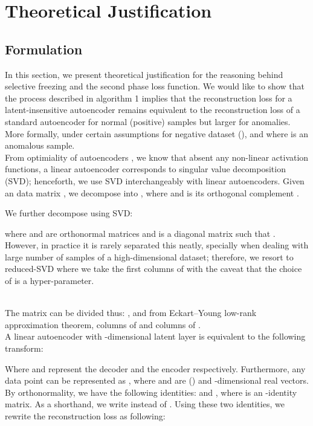\documentclass[acmtog, nonacm]{acmart}
\begin{document}
\section{Theoretical
Justification}
\subsection{Formulation}
\newcommand*{\vertbar}{\rule[-1ex]{0.5pt}{2.5ex}}
\newcommand*{\horzbar}{\rule[.5ex]{2.5ex}{0.5pt}}
\newcommand{\centered}[1]{\begin{tabular}{l} #1 \end{tabular}}
In this section, we present theoretical justification for the reasoning behind selective freezing and the second phase loss function. We would like to show that the process described in algorithm 1 implies that the reconstruction loss for a latent-insensitive autoencoder  remains equivalent to the reconstruction loss of a standard autoencoder  for normal (positive) samples but larger for anomalies. More formally, under certain assumptions for negative dataset (),  and   where  is an anomalous sample.\\
\noindent
From optimiality of autoencoders \cite{bourlard1988auto}, we know that absent any non-linear activation functions, a linear autoencoder corresponds to singular value decomposition (SVD); henceforth, we use SVD interchangeably with linear autoencoders. Given an  data matrix , 
we decompose  into , where  and   is its orthogonal complement .

\vspace{.1cm}
\noindent
We further decompose  using SVD:

where  and  are orthonormal matrices and  is a diagonal matrix such that . However, in practice it is rarely separated this neatly, specially when dealing with large number of samples of a high-dimensional dataset; therefore, we resort to reduced-SVD where we take the first  columns of  with the caveat that the choice of  is a hyper-parameter.


\\
The  matrix can be divided thus: , and from Eckart–Young low-rank approximation theorem, columns of  and columns of .
\\
A linear autoencoder with -dimensional latent layer is equivalent to the following transform:

Where  and  represent the decoder and the encoder respectively. Furthermore, any data point  can be represented as , where  and  are () and -dimensional real vectors. By orthonormality, we have the following identities:
 and , where  is an -identity matrix. As a shorthand, we write  instead of  .  Using these two identities, we rewrite the reconstruction loss  as following:
\end{document}
